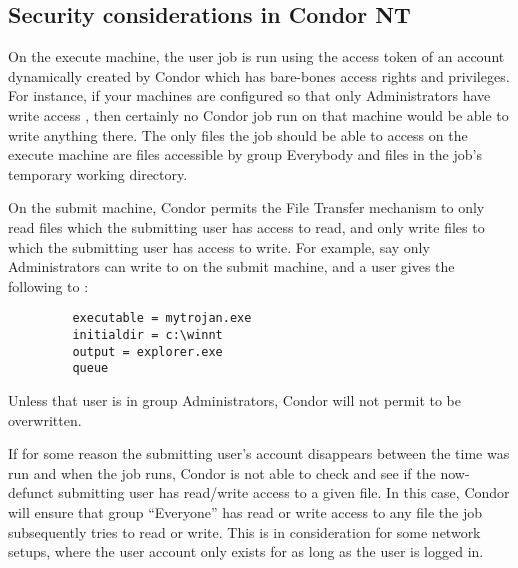 \subsection{Security considerations in Condor NT}

On the execute machine, the user job is run using the access token of an
account dynamically created by Condor which has bare-bones access rights and
privileges.  For instance, if your machines are configured so that only
Administrators have write access , then certainly no
Condor job run on that machine would be able to write anything there.  The
only files the job should be able to access on the execute machine are files
accessible by group Everybody and files in the job's temporary working
directory.

On the submit machine, Condor permits the File Transfer mechanism to only
read files which the submitting user has access to read, and only write
files to which the submitting user has access to write.  For example, say
only Administrators can write to  on the submit machine,
and a user gives the following to  :
\begin{verbatim}
         executable = mytrojan.exe
         initialdir = c:\winnt
         output = explorer.exe
         queue
\end{verbatim}
Unless that user is in group Administrators, Condor will not permit
 to be overwritten.  

If for some reason the submitting user's account disappears between the time
 was run and when the job runs, Condor is not able to check
and see if the now-defunct submitting user has read/write access to a given
file.  In this case, Condor will ensure that group ``Everyone'' has read or
write access to any file the job subsequently tries to read or write.  This
is in consideration for some network setups, where the user account only
exists for as long as the user is logged in.

